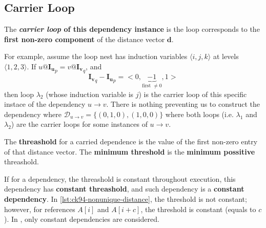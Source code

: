 \subsection{Carrier Loop}
The \textbf{\textit{carrier loop} of this dependency instance} is the loop
corresponds to the \textbf{first non-zero component} of the distance vector
$\mathbf{d}$.

For example, assume the loop nest has induction variables
$\langle i,j,k\rangle$ at levels $\langle 1,2,3\rangle$.
If $u@\mathbf{I_{u}}_{p} = v@\mathbf{I_{v}}_{q}$, and
\[
\mathbf{I_{v}}_{q} - \mathbf{I_{u}}_{p} = <0,
\underbrace{-1}_{\text{first }\ne 0}, 1>
\]
then loop $\lambda_2$ (whose induction variable is $j$)
is the carrier loop of this specific instace of the dependency $u \rightarrow v$.
There is nothing preventing us to construct the dependency where
$\mathcal{D}_{u \rightarrow v} = \{(0,1,0),(1,0,0)\}$ where both loops
(i.e. $\lambda_1$ and $\lambda_2$) are the carrier loops for some instances
of $u \rightarrow v$.

The \textbf{threashold} for a carried dependence is the value of the first non-zero entry
of that distance vector. The \textbf{minimum threshold} is the \textbf{minimum
possitive} threashold.

If for a dependency, the threashold is constant throughout execution, this
dependency has \textbf{constant threashold}, and such dependency is a
\textbf{constant dependency}. In
\cref{lst:ck94-nonunique-distance}, the threshold is not constant; however,
for references $A[i]$ and $A[i+c]$, the threshold is constant (equals to $c$).
In \cite{carrKennedy1994}, only constant dependencies are considered.



